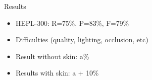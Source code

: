 
\begin{xpsectionbox}{Results}{}

\begin{itemize}
	\item HEPL-300: R=75\%, P=83\%, F=79\%
	\item Difficulties (quality, lighting, occlusion, etc)
	\item Result without skin: a\%
	\item Results with skin: a + 10\%
		
\end{itemize}
\end{xpsectionbox}


%
%
%
%
